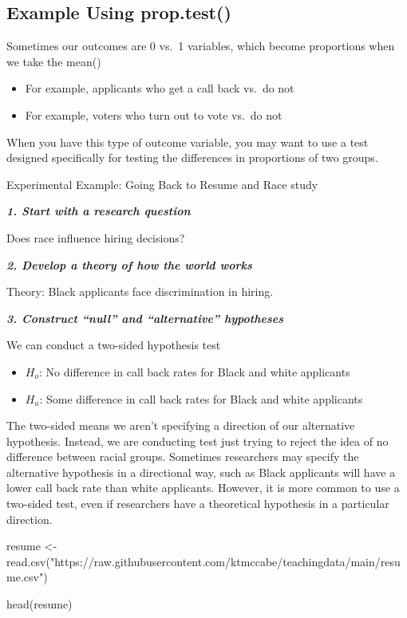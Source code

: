 \documentclass[
  letterpaper,
  DIV=11,
  numbers=noendperiod]{scrreprt}
\newenvironment{Shaded}{\begin{snugshade}}{\end{snugshade}}
\newcommand{\FunctionTok}[1]{\textcolor[rgb]{0.28,0.35,0.67}{#1}}
\newcommand{\NormalTok}[1]{\textcolor[rgb]{0.00,0.23,0.31}{#1}}
\newcommand{\OtherTok}[1]{\textcolor[rgb]{0.00,0.23,0.31}{#1}}
\newcommand{\StringTok}[1]{\textcolor[rgb]{0.13,0.47,0.30}{#1}}
\providecommand{\tightlist}{%
  \setlength{\itemsep}{0pt}\setlength{\parskip}{0pt}}\usepackage{longtable,booktabs,array}
\begin{document}
\hypertarget{example-using-prop.test}{%
\subsection{Example Using prop.test()}\label{example-using-prop.test}}

Sometimes our outcomes are 0 vs.~1 variables, which become proportions
when we take the mean()

\begin{itemize}
\tightlist
\item
  For example, applicants who get a call back vs.~do not
\item
  For example, voters who turn out to vote vs.~do not
\end{itemize}

When you have this type of outcome variable, you may want to use a test
designed specifically for testing the differences in proportions of two
groups.

Experimental Example: Going Back to Resume and Race study

\textbf{\emph{1. Start with a research question}}

Does race influence hiring decisions?

\textbf{\emph{2. Develop a theory of how the world works}}

Theory: Black applicants face discrimination in hiring.

\textbf{\emph{3. Construct ``null'' and ``alternative'' hypotheses}}

We can conduct a two-sided hypothesis test

\begin{itemize}
\tightlist
\item
  \(H_o\): No difference in call back rates for Black and white
  applicants
\item
  \(H_a\): Some difference in call back rates for Black and white
  applicants
\end{itemize}

The two-sided means we aren't specifying a direction of our alternative
hypothesis. Instead, we are conducting test just trying to reject the
idea of no difference between racial groups. Sometimes researchers may
specify the alternative hypothesis in a directional way, such as Black
applicants will have a lower call back rate than white applicants.
However, it is more common to use a two-sided test, even if researchers
have a theoretical hypothesis in a particular direction.

\begin{Shaded}
\begin{Highlighting}[]
\NormalTok{resume }\OtherTok{\textless{}{-}} \FunctionTok{read.csv}\NormalTok{(}\StringTok{"https://raw.githubusercontent.com/ktmccabe/teachingdata/main/resume.csv"}\NormalTok{)}

\FunctionTok{head}\NormalTok{(resume)}
\end{Highlighting}
\end{Shaded}
\end{document}
